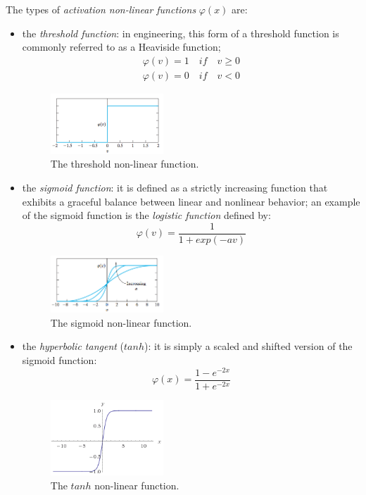 The types of \textit{activation non-linear functions} $\varphi(x)$ are:
\begin{itemize}
	
	\item the \textit{threshold function}: in engineering, this form of a threshold function is commonly referred to as a Heaviside function;
	\begin{eqnarray}
	\varphi \left( v \right) =1\quad if\quad v\ge 0 \\ 
	\varphi \left( v \right) =0\quad if\quad v<0
	\end{eqnarray}
	\begin{figure}
		\centering
		\includegraphics[width=0.4\textwidth]{img/Heaviside}
		\caption{The threshold non-linear function.}
	\end{figure}
	
	\item the \textit{sigmoid function}: it is defined as a strictly increasing function that exhibits a graceful balance between linear and nonlinear behavior; an example of the sigmoid function is the \textit{logistic function} defined by:
	\begin{equation}
	\varphi \left( v \right) =\frac { 1 }{ 1+exp\left( -av \right)  } 
	\end{equation}
	\begin{figure}
		\centering
		\includegraphics[width=0.4\textwidth]{img/sigmoid}
		\caption{The sigmoid non-linear function.}
	\end{figure}
	
	\item the \textit{ hyperbolic tangent } ($tanh$): it is simply a scaled and shifted version of the sigmoid function:
	\begin{equation}
	\varphi(x) = \frac{1-e^{-2x}}{1+e^{-2x}}
	\end{equation}
	\begin{figure}[t]
		\centering
		\includegraphics[width=0.4\textwidth]{img/tanh}
		\caption{The $tanh$ non-linear function.}
	\end{figure}
	

\end{itemize}

